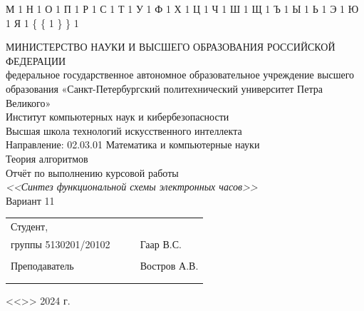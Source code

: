 \documentclass[a4paper, final]{article}
\begin{document}
{  {М}{ {\selectfont{}} }1
  {Н}{ {\selectfont{}} }1
  {О}{ {\selectfont{}} }1
  {П}{ {\selectfont{}} }1
  {Р}{ {\selectfont{}} }1
  {С}{ {\selectfont{}} }1
  {Т}{ {\selectfont{}} }1
  {У}{ {\selectfont{}} }1
  {Ф}{ {\selectfont{}} }1
  {Х}{ {\selectfont{}} }1
  {Ц}{ {\selectfont{}} }1
  {Ч}{ {\selectfont{}} }1
  {Ш}{ {\selectfont{}} }1
  {Щ}{ {\selectfont{}} }1
  {Ъ}{ {\selectfont{}} }1
  {Ы}{ {\selectfont{}} }1
  {Ь}{ {\selectfont{}} }1
  {Э}{ {\selectfont{}} }1
  {Ю}{ {\selectfont{}} }1
  {Я}{ {\selectfont{}} }1
  {\{}{ { {\color{brackets}\{} } }1 %
  {\} }{ { {\color{brackets}\} } } }1 %
}

\begin{center}
\hfill \break
\hfill \break
\normalsize{МИНИСТЕРСТВО НАУКИ И ВЫСШЕГО ОБРАЗОВАНИЯ РОССИЙСКОЙ ФЕДЕРАЦИИ\\
 федеральное государственное автономное образовательное учреждение высшего образования «Санкт-Петербургский политехнический университет Петра Великого»\\[5pt]}
\normalsize{Институт компьютерных наук и кибербезопасности}\\[5pt] 
\normalsize{Высшая школа технологий искусственного интеллекта}\\[5pt] 
\normalsize{Направление: 02.03.01 Математика и компьютерные науки}\\

\hfill \break
\hfill \break
\hfill \break
\large{Теория алгоритмов}\\
\hfill \break
\large{Отчёт по выполнению курсовой работы}\\
\large{\textit{<<Синтез функциональной схемы электронных часов>>\\}}
\large{Вариант 11\\}

\hfill \break
\hfill \break
\end{center}
 
\small{ 
\begin{tabular}{lrrl}
\!\!\!Студент, & \hspace{2cm} & & \\
\!\!\!группы 5130201/20102 & \hspace{2cm} & \underline{\hspace{3cm}} &Гаар В.С. \\\\
\!\!\!Преподаватель & \hspace{2cm} & \underline{\hspace{3cm}} &  Востров А.В. \\\\
&&\hspace{5cm}
\end{tabular}
\begin{flushright}
\hfill \break
<<\underline{\hspace{1cm}}>>\underline{\hspace{2.5cm}} 2024 г.
\end{flushright}
}
\end{document}
